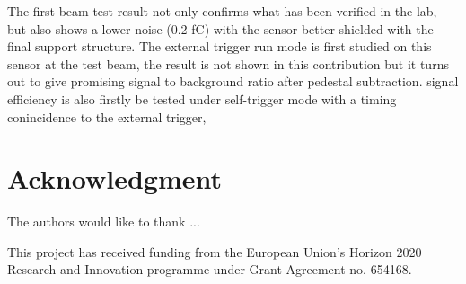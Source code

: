 \documentclass[conference]{IEEEtran}
\begin{document}
The first beam test result not only confirms what has been verified in the lab, but also shows a lower noise (0.2 fC) with the sensor better shielded with the final support structure.
The external trigger run mode is first studied on this sensor at the test beam, the result is not shown in this contribution but it turns out to give promising signal to background ratio after pedestal subtraction.
signal efficiency is also firstly be tested under self-trigger mode with a timing conincidence to the external trigger,




\section*{Acknowledgment}


The authors would like to thank ...

This project has received funding from the European Union’s Horizon 2020 Research and Innovation programme under Grant Agreement no. 654168.



\end{document}
